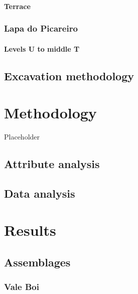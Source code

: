 \documentclass[12pt,twoside]{reedthesis}
\begin{document}
\hypertarget{terrace}{%
\subsubsection{Terrace}\label{terrace}}

\hypertarget{lapa-do-picareiro-1}{%
\subsection{Lapa do Picareiro}\label{lapa-do-picareiro-1}}

\hypertarget{levels-u-to-middle-t}{%
\subsubsection{Levels U to middle T}\label{levels-u-to-middle-t}}

\hypertarget{excavation-methodology}{%
\section{Excavation methodology}\label{excavation-methodology}}

\hypertarget{methodology}{%
\chapter{Methodology}\label{methodology}}

Placeholder

\hypertarget{attribute-analysis}{%
\section{Attribute analysis}\label{attribute-analysis}}

\hypertarget{data-analysis}{%
\section{Data analysis}\label{data-analysis}}

\hypertarget{results}{%
\chapter{Results}\label{results}}

\hypertarget{assemblages}{%
\section{Assemblages}\label{assemblages}}

\hypertarget{vale-boi-2}{%
\subsection{Vale Boi}\label{vale-boi-2}}
\end{document}
